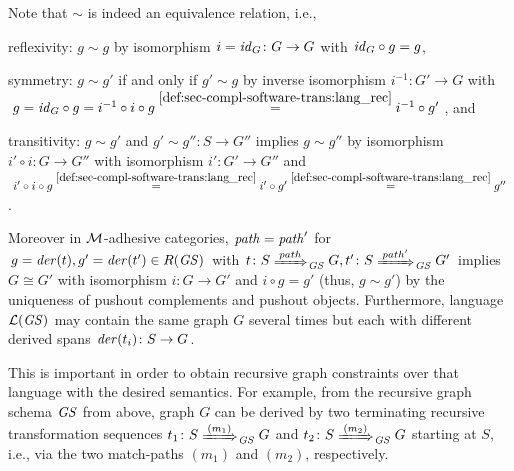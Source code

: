 \begin{remark}
Note that $\sim$ is indeed an equivalence relation, i.e., 
\begin{enumerate*}
\item reflexivity: $g \sim g$ by isomorphism $i=\mathit{id}_G\colon G \to G$ with $\mathit{id}_G \circ g = g$,
\item symmetry: $g \sim g'$ if and only if $g' \sim g$ by inverse isomorphism $i^{-1}\colon G' \to G$ with $g=\id_G \circ g=i^{-1} \circ i \circ g\stackrel{\cref{def:sec-compl-software-trans:lang_rec}}{=} i^{-1} \circ g'$, and
\item transitivity: $g \sim g'$ and $g' \sim g''\colon S \to G''$ implies $g \sim g''$ by isomorphism $i' \circ i\colon G \to G''$ with isomorphism $i'\colon G' \to G''$ and $i' \circ i \circ g \stackrel{\cref{def:sec-compl-software-trans:lang_rec}}{=} i' \circ g' \stackrel{\cref{def:sec-compl-software-trans:lang_rec}}{=} g''$.
\end{enumerate*}
Moreover in ${\cal M}$-adhesive categories, $\mathit{path}=\mathit{path}'$ for $g=\mathit{der}(t),g'=\mathit{der}(t') \in R(\mathit{GS})$ with $t\colon S \Trans{path}_\GS G,t'\colon S \Trans{path'}_\GS G'$ implies $G \cong G'$ with isomorphism $i\colon G \to G'$ and $i \circ g = g'$ (thus, $g \sim g'$) by the uniqueness of pushout complements and pushout objects.
Furthermore, language $\mathcal{L}(\mathit{GS})$ may contain the same graph $G$ several times but each with different derived spans $\mathit{der}(t_i)\colon S \to G$.
  \begin{center}
  \end{center}
This is important in order to obtain recursive graph constraints over that language with the desired semantics.
For example, from the recursive graph schema $\mathit{GS}$ from above, graph $G$ can be derived by two terminating recursive transformation sequences $t_1\colon S \Trans{(m_1)}_\GS G$ and $t_2\colon S \Trans{(m_2)}_\GS G$ starting at $S$, i.e., via the two match-paths $(m_1)$ and $(m_2)$, respectively.

\end{remark}
